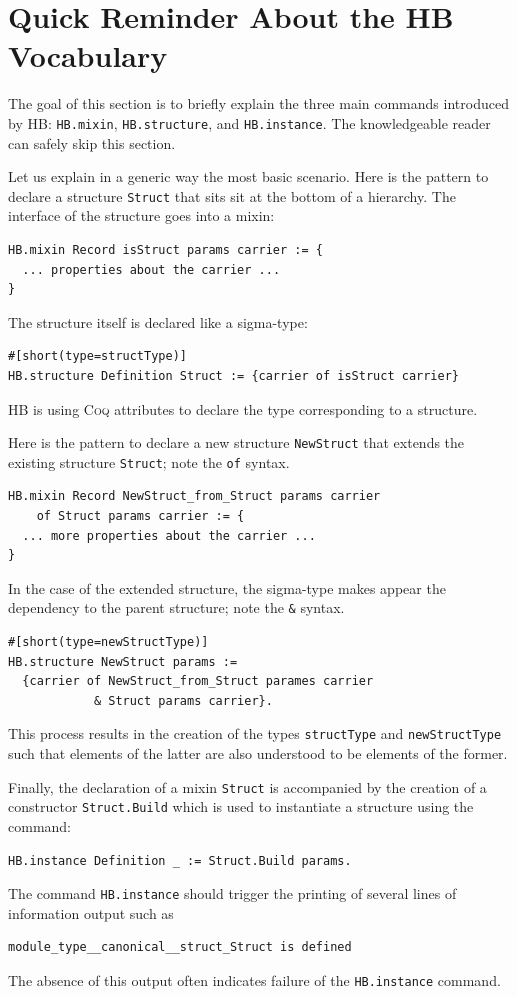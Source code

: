 \documentclass{article}
\def\coq{\textsc{Coq}}
\def\hb{\textsc{HB}}
\def\coqin#1{\texttt{#1}}
\begin{document}
\section{Quick Reminder About the \hb{} Vocabulary}
\label{sec:reminder}

The goal of this section is to briefly explain the three main commands
introduced by \hb: \coqin{HB.mixin}, \coqin{HB.structure}, and
\coqin{HB.instance}. The knowledgeable reader can safely skip this
section.

Let us explain in a generic way the most basic scenario.
Here is the pattern to declare a structure \coqin{Struct} that sits
sit at the bottom of a hierarchy.  The interface of the structure goes
into a mixin:
\begin{verbatim}
HB.mixin Record isStruct params carrier := {
  ... properties about the carrier ...
}
\end{verbatim}

The structure itself is declared like a sigma-type:
\begin{verbatim}
#[short(type=structType)]
HB.structure Definition Struct := {carrier of isStruct carrier}
\end{verbatim}
\hb{} is using \coq{} attributes to declare the type corresponding to a structure.

Here is the pattern to declare a new structure \coqin{NewStruct} that
extends the existing structure \coqin{Struct}; note the \coqin{of} syntax.
\begin{verbatim}
HB.mixin Record NewStruct_from_Struct params carrier
    of Struct params carrier := {
  ... more properties about the carrier ...
}
\end{verbatim}

In the case of the extended structure, the sigma-type makes appear the
dependency to the parent structure; note the \coqin{&} syntax.
\begin{verbatim}
#[short(type=newStructType)]
HB.structure NewStruct params :=
  {carrier of NewStruct_from_Struct parames carrier
            & Struct params carrier}.
\end{verbatim}

This process results in the creation of the types \coqin{structType}
and \coqin{newStructType} such that elements of the latter are also
understood to be elements of the former.

Finally, the declaration of a mixin \coqin{Struct} is accompanied by
the creation of a constructor \coqin{Struct.Build} which is used to instantiate
a structure using the command:
\begin{verbatim}
HB.instance Definition _ := Struct.Build params.
\end{verbatim}
The command \coqin{HB.instance} should trigger the printing of several
lines of information output such as
\begin{verbatim}
module_type__canonical__struct_Struct is defined
\end{verbatim}
The absence of this output often indicates failure of the
\coqin{HB.instance} command.
\end{document}
